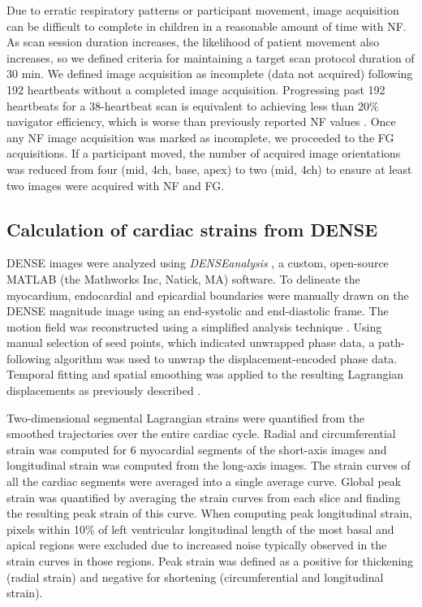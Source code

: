 	Due to erratic respiratory patterns or participant movement, image acquisition can be difficult to complete in children in a reasonable amount of time with NF. As scan session duration increases, the likelihood of patient movement also increases, so we defined criteria for maintaining a target scan protocol duration of 30 min. We defined image acquisition as incomplete (data not acquired) following 192 heartbeats without a completed image acquisition. Progressing past 192 heartbeats for a 38-heartbeat scan is equivalent to achieving less than 20\% navigator efficiency, which is worse than previously reported NF values \cite{Abd-Elmoniem2011,Feuerlein2009,Jhooti2011,Wang1996}. Once any NF image acquisition was marked as incomplete, we proceeded to the FG acquisitions. If a participant moved, the number of acquired image orientations was reduced from four (mid, 4ch, base, apex) to two (mid, 4ch) to ensure at least two images were acquired with NF and FG.

\subsection{Calculation of cardiac strains from DENSE}
	DENSE images were analyzed using \textit{DENSEanalysis} \cite{Gilliam2016a}, a custom, open-source MATLAB (the Mathworks Inc, Natick, MA) software. To delineate the myocardium, endocardial and epicardial boundaries were manually drawn on the DENSE magnitude image using an end-systolic and end-diastolic frame. The motion field was reconstructed using a simplified analysis technique \cite{Suever2014}. Using manual selection of seed points, which indicated unwrapped phase data, a path-following algorithm was used to unwrap the displacement-encoded phase data. Temporal fitting and spatial smoothing was applied to the resulting Lagrangian displacements as previously described \cite{Spottiswoode2007}.
	
	Two-dimensional segmental Lagrangian strains were quantified from the smoothed trajectories over the entire cardiac cycle. Radial and circumferential strain was computed for 6 myocardial segments of the short-axis images and longitudinal strain was computed from the long-axis images. The strain curves of all the cardiac segments were averaged into a single average curve. Global peak strain was quantified by averaging the strain curves from each slice and finding the resulting peak strain of this curve. When computing peak longitudinal strain, pixels within 10\% of left ventricular longitudinal length of the most basal and apical regions were excluded due to increased noise typically observed in the strain curves in those regions. Peak strain was defined as a positive for thickening (radial strain) and negative for shortening (circumferential and longitudinal strain).

